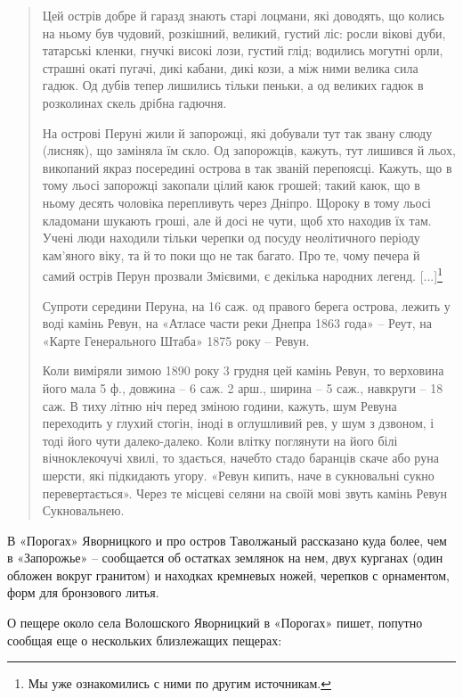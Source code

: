 \begin{quotation}
Цей острів добре й гаразд знають старі лоцмани, які доводять, що колись на ньому був чудовий, розкішний, великий, густий ліс: росли вікові дуби, татарські кленки, гнучкі високі лози, густий глід; водились могутні орли, страшні окаті пугачі, дикі кабани, дикі кози, а між ними велика сила гадюк. Од дубів тепер лишились тільки пеньки, а од великих гадюк в розколинах скель дрібна гадючня.

На острові Перуні жили й запорожці, які добували тут так звану слюду (лисняк), що заміняла їм скло. Од запорожців, кажуть, тут лишився й льох, викопаний якраз посередині острова в так званій перепоясці. Кажуть, що в тому льосі запорожці закопали цілий каюк грошей; такий каюк, що в ньому десять чоловіка перепливуть через Дніпро. Щороку в тому льосі кладомани шукають гроші, але й досі не чути, щоб хто находив їх там. Учені люди находили тільки черепки од посуду неолітичного періоду кам'яного віку, та й то поки що не так багато. Про те, чому печера й самий острів Перун прозвали Змієвими, є декілька народних легенд. [...]\footnote{Мы уже ознакомились с ними по другим источникам.}

Супроти середини Перуна, на 16 саж. од правого берега острова, лежить у воді камінь Ревун, на «Атласе части реки Днепра 1863 года» – Реут, на «Карте Генерального Штаба» 1875 року – Ревун.

Коли виміряли зимою 1890 року 3 грудня цей камінь Ревун, то верховина його мала 5 ф., довжина – 6 саж. 2 арш., ширина – 5 саж., навкруги – 18 саж. В тиху літню ніч перед зміною години, кажуть, шум Ревуна переходить у глухий стогін, іноді в оглушливий рев, у шум з дзвоном, і тоді його чути далеко-далеко. Коли влітку поглянути на його білі вічноклекочучі хвилі, то здається, начебто стадо баранців скаче або руна шерсти, які підкидають угору. «Ревун кипить, наче в сукновальні сукно перевертається». Через те місцеві селяни на своїй мові звуть камінь Ревун Сукновальнею.
\end{quotation}

В «Порогах» Яворницкого и про остров Таволжаный рассказано куда более, чем в «Запорожье» – сообщается об остатках землянок на нем, двух курганах (один обложен вокруг гранитом) и находках кремневых ножей, черепков с орнаментом, форм для бронзового литья.

О пещере около села Волошского Яворницкий в «Порогах» пишет, попутно сообщая еще о нескольких близлежащих пещерах:

